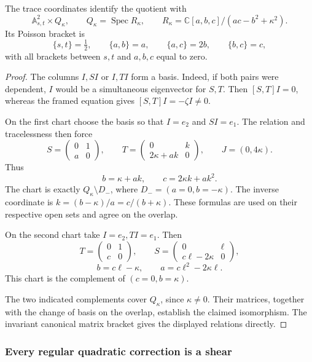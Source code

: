 \begin{lemma}\label{mht:frgl:lem:global-carrier}
The trace coordinates identify the quotient with
\[
 \mathbb A^2_{s,t}\times Q_\kappa,
 \qquad Q_\kappa=\operatorname{Spec}
 R_\kappa,\qquad
 R_\kappa=\mathbb C[a,b,c]/(ac-b^2+\kappa^2).
\]
Its Poisson bracket is
\[
 \{s,t\}=\tfrac12,\qquad
 \{a,b\}=a,\qquad\{a,c\}=2b,\qquad\{b,c\}=c,
\]
with all brackets between $s,t$ and $a,b,c$ equal to zero.
\end{lemma}

\begin{proof}
The columns $I,SI$ or $I,TI$ form a basis. Indeed, if both pairs
were dependent, $I$ would be a simultaneous eigenvector for $S,T$.
Then $[S,T]I=0$, whereas the framed equation gives
$[S,T]I=-\zeta I\ne0$.

On the first chart choose the basis so that $I=e_2$ and $SI=e_1$.
The relation and tracelessness then force
\[
 S=\begin{pmatrix}0&1\\a&0\end{pmatrix},\qquad
 T=\begin{pmatrix}0&k\\2\kappa+ak&0\end{pmatrix},\qquad
 J=(0,4\kappa).
\]
Thus
\[
 b=\kappa+ak,\qquad c=2\kappa k+ak^2.
\]
The chart is exactly $Q_\kappa\setminus D_-$, where
$D_-=(a=0,b=-\kappa)$. The inverse coordinate is
$k=(b-\kappa)/a=c/(b+\kappa)$. These formulas are used on their
respective open sets and agree on the overlap.

On the second chart take $I=e_2,TI=e_1$. Then
\[
 T=\begin{pmatrix}0&1\\c&0\end{pmatrix},\qquad
 S=\begin{pmatrix}0&\ell\\c\ell-2\kappa&0\end{pmatrix},
\]
\[
 b=c\ell-\kappa,\qquad a=c\ell^2-2\kappa\ell.
\]
This chart is the complement of $(c=0,b=\kappa)$.

The two indicated complements cover $Q_\kappa$, since
$\kappa\ne0$. Their matrices, together with the change of basis
on the overlap, establish the claimed isomorphism. The invariant
canonical matrix bracket gives the displayed relations directly.
\end{proof}

\subsubsection{Every regular quadratic correction is a shear}

